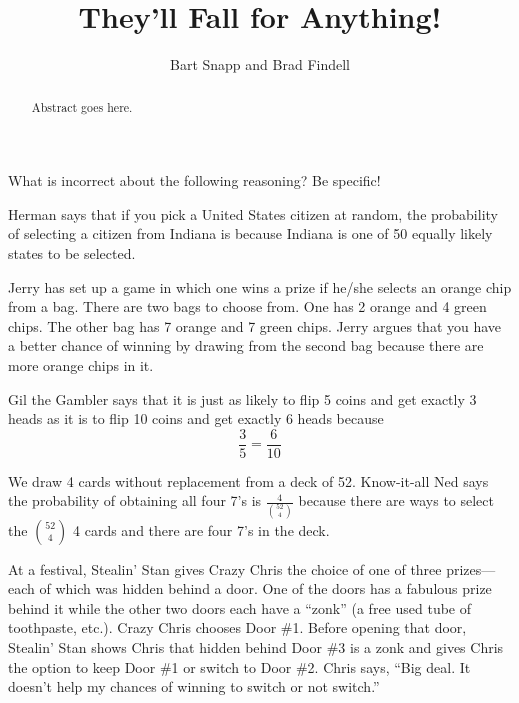 \documentclass{ximera}
\title{They'll Fall for Anything!}
\author{Bart Snapp and Brad Findell}
\begin{document}
\begin{abstract}
Abstract goes here.  
\end{abstract}
\maketitle

\label{A:fallForAnything}

What is incorrect about the following reasoning? Be specific!

\begin{problem}
Herman says that if you pick a United States citizen at random, the
probability of selecting a citizen from Indiana is because Indiana is
one of 50 equally likely states to be selected.
\end{problem}


\begin{problem}
Jerry has set up a game in which one wins a prize if he/she selects an
orange chip from a bag.  There are two bags to choose from.  One has 2
orange and 4 green chips.  The other bag has 7 orange and 7 green
chips.  Jerry argues that you have a better chance of winning by
drawing from the second bag because there are more orange chips in it.
\end{problem}

\begin{problem}
Gil the Gambler says that it is just as likely to flip 5 coins and get
exactly 3 heads as it is to flip 10 coins and get exactly 6 heads
because
\[
\frac{3}{5} = \frac{6}{10}
\]
\end{problem}

\begin{problem}
We draw 4 cards without replacement from a deck of 52.  Know-it-all
Ned says the probability of obtaining all four 7's is
$\frac{4}{\binom{52}{4}}$ because there are ways to select the
$\binom{52}{4}$ 4 cards and there are four 7's in the deck.
\end{problem} 

\begin{problem}
At a festival, Stealin' Stan gives Crazy Chris the choice of one of
three prizes---each of which was hidden behind a door.  One of the
doors has a fabulous prize behind it while the other two doors each
have a ``zonk'' (a free used tube of toothpaste, etc.).  Crazy Chris
chooses Door \#1.  Before opening that door, Stealin' Stan shows Chris
that hidden behind Door \#3 is a zonk and gives Chris the option to
keep Door \#1 or switch to Door \#2.  Chris says, ``Big deal.  It doesn't
help my chances of winning to switch or not switch.''
\end{problem}
\end{document}
